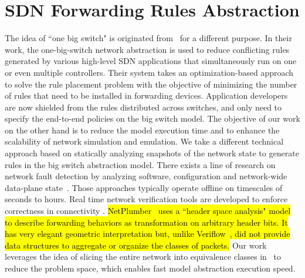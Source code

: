 \section{SDN Forwarding Rules Abstraction}
\label{OBS:Sec:RelatedWorks}

The idea of ``one big switch" is originated from~\mbox{\cite{OneBigSwitchAbstraction}} for a different purpose.
In their work, the one-big-switch network abstraction is used to reduce conflicting rules generated by
various high-level SDN applications that simultaneously run on one or even multiple controllers.
Their system takes an optimization-based approach to solve the rule placement problem with
the objective of minimizing the number of rules that need to be installed in forwarding devices.
Application developers are now shielded from the rules distributed across switches, and only need to specify the end-to-end policies on the big switch model. 
The objective of our work on the other hand is to reduce the model execution time and to
enhance the scalability of network simulation and emulation.
We take a different technical approach based on statically analyzing snapshots of the network state to generate rules in the big switch abstraction model.
There exists a line of research on network fault detection by analyzing software,
configuration and network-wide data-plane state~\cite{Al-Shaer2010,Al-Shaer2009,Anteater2011,xz+05}.
Those approaches typically operate offline on timescales of seconds to hours.
Real time network verification tools are developed to enforce correctness in connectivity \cite{NetPlumber2013,Veriflow}.
\hl{
NetPlumber~\mbox{\cite{NetPlumber2013}} uses a ``header space analysis" model to
describe forwarding behaviors as transformation on arbitrary header bits.
It has very elegant geometric interpretation but, unlike Veriflow~\mbox{\cite{Veriflow}}, did not
provide data structures to aggregate or organize the classes of packets.
}
\fi
Our work leverages the idea of slicing the entire network into equivalence classes in~\cite{Veriflow}
to reduce the problem space, which enables fast model abstraction execution speed.


